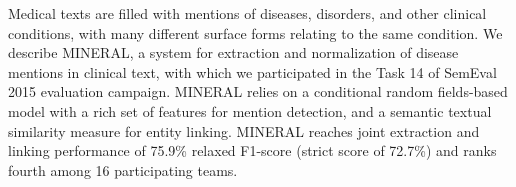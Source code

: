 Medical texts are filled with mentions of diseases, disorders, and other clinical conditions, with many different surface forms relating to the same condition. We describe MINERAL, a system for extraction and normalization of disease mentions in clinical text, with which we participated in the Task 14 of SemEval 2015 evaluation campaign. MINERAL relies on a conditional random fields-based model with a rich set of features for mention detection, and a semantic textual similarity measure for entity linking. MINERAL reaches joint extraction and linking performance of 75.9\% relaxed F1-score (strict score of 72.7\%) and ranks fourth among 16 participating teams.
